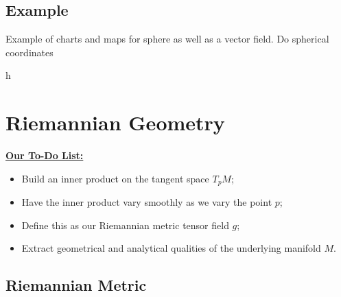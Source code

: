 \documentclass[UKenglish]{beamer}
\begin{document}
\subsection{Example}

\begin{frame}{}
	Example of charts and maps for sphere as well as a vector field.  Do spherical coordinates
\end{frame}

\begin{frame}{}
\vfill
\begin{figure}[H]
	\centering
	\def\svgwidth{\columnwidth}
	
\end{figure}
\vfill
\end{frame}

\begin{frame}{}
\vfill
\begin{figure}[H]
	\centering
	\def\svgwidth{\columnwidth}
	
\end{figure}
\vfill
h
\end{frame}

\begin{frame}{}
\vfill
\begin{figure}[H]
	\centering
	\def\svgwidth{\columnwidth}
	
\end{figure}
\vfill
\end{frame}

\section{Riemannian Geometry}

\begin{frame}{}
\vfill
\textbf{\underline{Our To-Do List:}}
\begin{itemize}
	\item Build an inner product on the tangent space $T_pM$;
	\pause
	\item Have the inner product vary smoothly as we vary the point $p$;
	\pause
	\item Define this as our Riemannian metric tensor field $g$;
	\pause
	\item Extract geometrical and analytical qualities of the underlying manifold $M$.
\end{itemize}
\vfill
\end{frame}


\subsection{Riemannian Metric}
\end{document}
